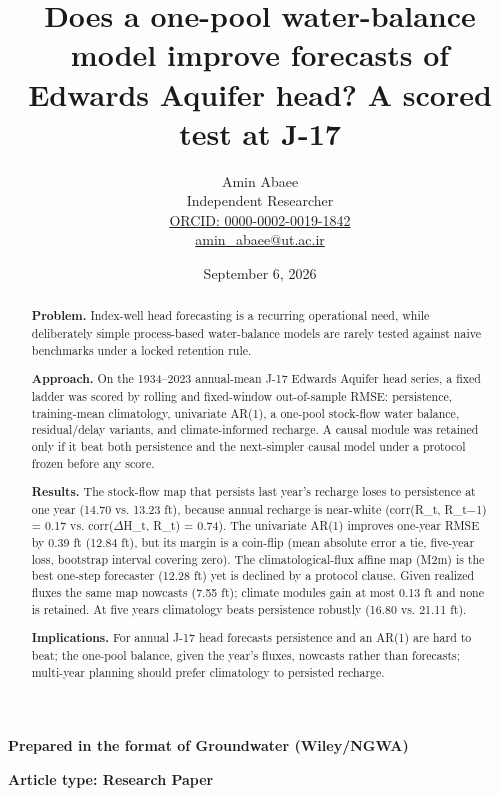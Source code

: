 \documentclass[11pt]{article}
\begin{document}
\title{Does a one-pool water-balance model improve forecasts of Edwards Aquifer head? A scored test at J-17}
\author{Amin Abaee\\[0.35em]
{\small Independent Researcher}\\[0.55em]
{\small\href{https://orcid.org/0000-0002-0019-1842}{ORCID: 0000-0002-0019-1842}}\\[0.3em]
{\small\href{mailto:amin\_abaee@ut.ac.ir}{amin\_abaee@ut.ac.ir}}}
\date{September 6, 2026}
\maketitle

{\centering\small \textbf{Prepared in the format of Groundwater (Wiley/NGWA)}\par}
{\centering\small \textbf{Article type: Research Paper}\par}

\begin{abstract}


\textbf{Problem.} Index-well head forecasting is a recurring operational need, while deliberately simple process-based water-balance models are rarely tested against naive benchmarks under a locked retention rule.

\textbf{Approach.} On the 1934--2023 annual-mean J-17 Edwards Aquifer head series, a fixed ladder was scored by rolling and fixed-window out-of-sample RMSE: persistence, training-mean climatology, univariate AR(1), a one-pool stock-flow water balance, residual/delay variants, and climate-informed recharge. A causal module was retained only if it beat both persistence and the next-simpler causal model under a protocol frozen before any score.

\textbf{Results.} The stock-flow map that persists last year's recharge loses to persistence at one year (14.70 vs. 13.23 ft), because annual recharge is near-white (corr(R\_t, R\_{t\ensuremath{-}1}) = 0.17 vs. corr(\ensuremath{\Delta}H\_t, R\_t) = 0.74). The univariate AR(1) improves one-year RMSE by 0.39 ft (12.84 ft), but its margin is a coin-flip (mean absolute error a tie, five-year loss, bootstrap interval covering zero). The climatological-flux affine map (M2m) is the best one-step forecaster (12.28 ft) yet is declined by a protocol clause. Given realized fluxes the same map nowcasts (7.55 ft); climate modules gain at most 0.13 ft and none is retained. At five years climatology beats persistence robustly (16.80 vs. 21.11 ft).

\textbf{Implications.} For annual J-17 head forecasts persistence and an AR(1) are hard to beat; the one-pool balance, given the year's fluxes, nowcasts rather than forecasts; multi-year planning should prefer climatology to persisted recharge.

\end{abstract}
\end{document}
